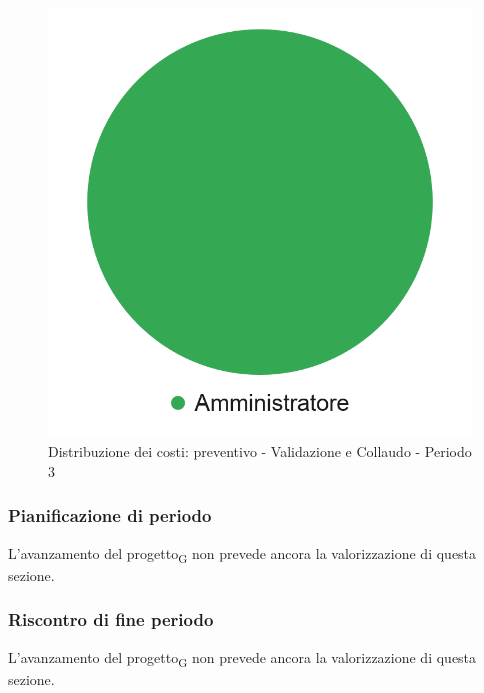 \hspace{-1cm}
\begin{minipage}{.50\textwidth}
\smallPreventivoTable{
	
}
\end{minipage}
\hspace{1cm}
\begin{minipage}{.40\textwidth}
\begin{figure}[H]
	\includegraphics[scale=0.21]{res/images/charts/preventivo_priori/Grafico4-11.png}
	\caption{Distribuzione dei costi: preventivo - Validazione e Collaudo - Periodo 3}
\end{figure}
\end{minipage} 


\subsubsection{Pianificazione di periodo}


L'avanzamento del progetto\textsubscript{G} non prevede ancora la valorizzazione di questa sezione.



\subsubsection{Riscontro di fine periodo}


L'avanzamento del progetto\textsubscript{G} non prevede ancora la valorizzazione di questa sezione.
